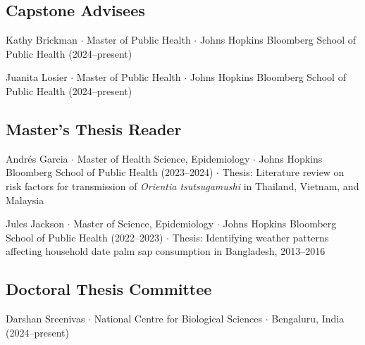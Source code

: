 \documentclass{cv}
\begin{document}
\subsection*{Capstone Advisees}

Kathy Brickman $\cdot$ Master of Public Health $\cdot$ Johns Hopkins Bloomberg School of Public Health (2024--present)

Juanita Losier $\cdot$ Master of Public Health $\cdot$ Johns Hopkins Bloomberg School of Public Health (2024--present)

\subsection*{Master's Thesis Reader}

Andrés Garcia $\cdot$ Master of Health Science, Epidemiology $\cdot$ Johns Hopkins Bloomberg School of Public Health (2023--2024) $\cdot$ Thesis: Literature review on risk factors for transmission of \textit{Orientia tsutsugamushi} in Thailand, Vietnam, and Malaysia

Jules Jackson $\cdot$ Master of Science, Epidemiology $\cdot$ Johns Hopkins Bloomberg School of Public Health (2022--2023) $\cdot$ Thesis: Identifying weather patterns affecting household date palm sap consumption in Bangladesh, 2013--2016

\subsection*{Doctoral Thesis Committee}

Darshan Sreenivas $\cdot$ National Centre for Biological Sciences $\cdot$ Bengaluru, India (2024--present)




\end{document}

